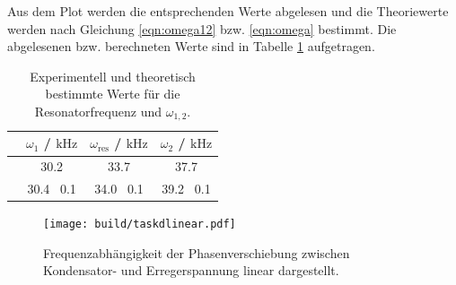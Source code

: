 Aus dem Plot werden die entsprechenden Werte abgelesen und die Theoriewerte werden nach Gleichung \eqref{eqn:omega12} bzw. \eqref{eqn:omega} bestimmt.
Die abgelesenen bzw. berechneten Werte sind in Tabelle \ref{tab:senseless_table} aufgetragen.
\begin{table}
	\caption{Experimentell und theoretisch bestimmte Werte für die Resonatorfrequenz und $\omega_{1,2}$.}
	\centering
	\label{tab:senseless_table}
	\begin{tabular}{cccc}
		\toprule
		                   & $\omega_1$ / $\si{\kilo\hertz}$ & $\omega_{\mathrm{res}}$ / $\si{\kilo\hertz}$ & $\omega_2$ / $\si{\kilo\hertz}$ \\
		\midrule
		\text{Abgelesen}   & 30.2                            & 33.7                                         & 37.7                            \\
		\text{Theoriewert} & 30.4 \pm \, 0.1                 & 34.0 \pm \, 0.1                              & 39.2 \pm \, 0.1                 \\
		\bottomrule
	\end{tabular}
\end{table}
\begin{figure}
	\centering
	\texttt{[image: build/taskdlinear.pdf]}
	\caption{Frequenzabhängigkeit der Phasenverschiebung zwischen Kondensator- und Erregerspannung linear dargestellt.}
	\label{fig:phasenplotlinear}
\end{figure}
